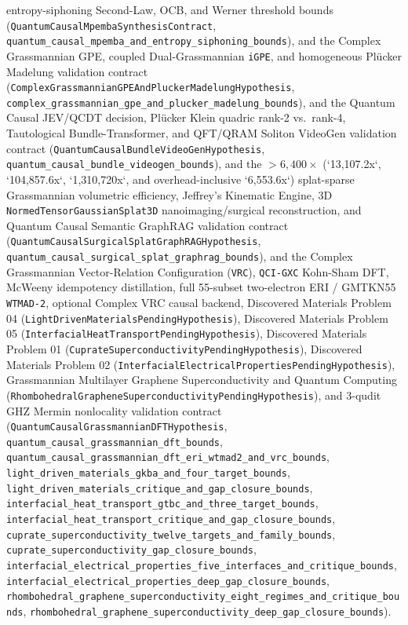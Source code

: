entropy-siphoning Second-Law, OCB, and Werner threshold bounds
(\texttt{QuantumCausalMpembaSynthesisContract}, \texttt{quantum\_causal\_mpemba\_and\_entropy\_siphoning\_bounds}),
and the Complex Grassmannian GPE, coupled Dual-Grassmannian \texttt{iGPE},
and homogeneous Plücker Madelung validation contract
(\texttt{ComplexGrassmannianGPEAndPluckerMadelungHypothesis},
\texttt{complex\_grassmannian\_gpe\_and\_plucker\_madelung\_bounds}),
and the Quantum Causal JEV/QCDT decision, Plücker Klein quadric rank-2 vs.\
rank-4, Tautological Bundle-Transformer, and QFT/QRAM Soliton VideoGen
validation contract
(\texttt{QuantumCausalBundleVideoGenHypothesis},
\texttt{quantum\_causal\_bundle\_videogen\_bounds}),
and the $>6{,}400\times$ (`13,107.2x`, `104,857.6x`, `1,310,720x`, and overhead-inclusive `6,553.6x`)
splat-sparse Grassmannian volumetric efficiency, Jeffrey's Kinematic Engine, 3D
\texttt{NormedTensorGaussianSplat3D} nanoimaging/surgical reconstruction, and Quantum Causal
Semantic GraphRAG validation contract
(\texttt{QuantumCausalSurgicalSplatGraphRAGHypothesis},
\texttt{quantum\_causal\_surgical\_splat\_graphrag\_bounds}),
and the Complex Grassmannian Vector-Relation Configuration (\texttt{VRC}),
\texttt{QCI-GXC} Kohn-Sham DFT, McWeeny idempotency distillation, full 55-subset
two-electron ERI / GMTKN55 \texttt{WTMAD-2}, optional Complex VRC causal backend,
Discovered Materials Problem 04 (\texttt{LightDrivenMaterialsPendingHypothesis}),
Discovered Materials Problem 05 (\texttt{InterfacialHeatTransportPendingHypothesis}),
Discovered Materials Problem 01 (\texttt{CuprateSuperconductivityPendingHypothesis}),
Discovered Materials Problem 02 (\texttt{InterfacialElectricalPropertiesPendingHypothesis}),
Grassmannian Multilayer Graphene Superconductivity and Quantum Computing (\texttt{RhombohedralGrapheneSuperconductivityPendingHypothesis}),
and 3-qudit GHZ Mermin nonlocality validation contract
(\texttt{QuantumCausalGrassmannianDFTHypothesis},
\texttt{quantum\_causal\_grassmannian\_dft\_bounds},
\texttt{quantum\_causal\_grassmannian\_dft\_eri\_wtmad2\_and\_vrc\_bounds},
\texttt{light\_driven\_materials\_gkba\_and\_four\_target\_bounds},
\texttt{light\_driven\_materials\_critique\_and\_gap\_closure\_bounds},
\texttt{interfacial\_heat\_transport\_gtbc\_and\_three\_target\_bounds},
\texttt{interfacial\_heat\_transport\_critique\_and\_gap\_closure\_bounds},
\texttt{cuprate\_superconductivity\_twelve\_targets\_and\_family\_bounds},
\texttt{cuprate\_superconductivity\_gap\_closure\_bounds},
\texttt{interfacial\_electrical\_properties\_five\_interfaces\_and\_critique\_bounds},
\texttt{interfacial\_electrical\_properties\_deep\_gap\_closure\_bounds},
\texttt{rhombohedral\_graphene\_superconductivity\_eight\_regimes\_and\_critique\_bounds},
\texttt{rhombohedral\_graphene\_superconductivity\_deep\_gap\_closure\_bounds}).

